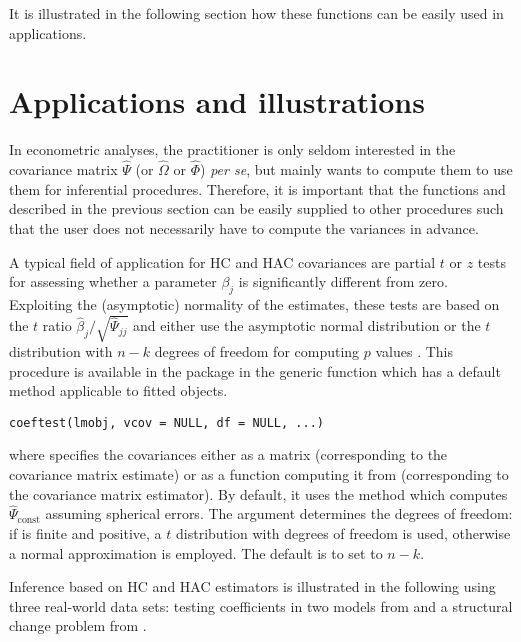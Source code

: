 \documentclass{Z}
\begin{document}
It is illustrated in the following section how these functions can be easily used in
applications.


\section{Applications and illustrations} \label{sec:applications}

In econometric analyses, the practitioner is only seldom interested in the covariance
matrix $\hat \Psi$ (or $\hat \Omega$ or $\hat \Phi$) \emph{per se}, but mainly
wants to compute them to use them for inferential procedures. Therefore, it is
important that the functions  and  described in the
previous section can be easily supplied to other procedures such that the user does
not necessarily have to compute the variances in advance.

A typical field of application for HC and HAC covariances are partial $t$ or $z$ tests
for assessing whether a parameter $\beta_j$ is significantly different from zero.
Exploiting the (asymptotic) normality of the estimates, these
tests are based on the $t$ ratio $\hat \beta_j/\sqrt{\hat \Psi_{jj}}$ and either use
the asymptotic normal distribution or the $t$ distribution with
$n-k$ degrees of freedom for computing $p$ values \citep{hac:White:2000}.
This procedure is available
in the  package  \citep{hac:Zeileis+Hothorn:2002} in the
generic function  which has a default method applicable to fitted  objects.
\begin{verbatim}
coeftest(lmobj, vcov = NULL, df = NULL, ...)
\end{verbatim}
where  specifies the covariances either as a matrix (corresponding to
the covariance matrix estimate) or as a function computing it from 
(corresponding to the covariance matrix estimator). By default, it uses the 
method which computes $\hat \Psi_{\mathrm{const}}$ assuming spherical errors. The 
argument determines the degrees of freedom: if  is finite and positive, a $t$
distribution with  degrees of freedom is used, otherwise a normal approximation
is employed. The default is to set  to $n-k$.

Inference based on HC and HAC estimators is illustrated in the following using three
real-world data sets: testing coefficients in two models from \cite{hac:Greene:1993}
and a structural change problem from \cite{hac:Bai+Perron:2003}.
\end{document}
